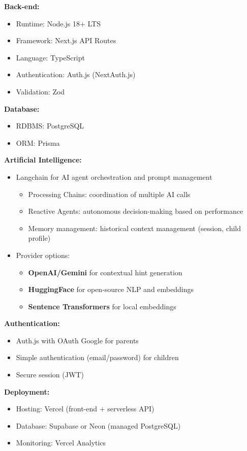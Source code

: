\documentclass[12pt,a4paper]{article}
\begin{document}
\textbf{Back-end:}
\begin{itemize}
    \item Runtime: Node.js 18+ LTS
    \item Framework: Next.js API Routes
    \item Language: TypeScript
    \item Authentication: Auth.js (NextAuth.js)
    \item Validation: Zod
\end{itemize}

\textbf{Database:}
\begin{itemize}
    \item RDBMS: PostgreSQL
    \item ORM: Prisma
\end{itemize}

\textbf{Artificial Intelligence:}
\begin{itemize}
    \item Langchain for AI agent orchestration and prompt management
    \begin{itemize}
        \item Processing Chains: coordination of multiple AI calls
        \item Reactive Agents: autonomous decision-making based on performance
        \item Memory management: historical context management (session, child profile)
    \end{itemize}
    \item Provider options:
    \begin{itemize}
        \item \textbf{OpenAI/Gemini} for contextual hint generation
        \item \textbf{HuggingFace} for open-source NLP and embeddings
        \item \textbf{Sentence Transformers} for local embeddings
    \end{itemize}
\end{itemize}

\textbf{Authentication:}
\begin{itemize}
    \item Auth.js with OAuth Google for parents
    \item Simple authentication (email/password) for children
    \item Secure session (JWT)
\end{itemize}

\textbf{Deployment:}
\begin{itemize}
    \item Hosting: Vercel (front-end + serverless API)
    \item Database: Supabase or Neon (managed PostgreSQL)
    \item Monitoring: Vercel Analytics
\end{itemize}
\end{document}
